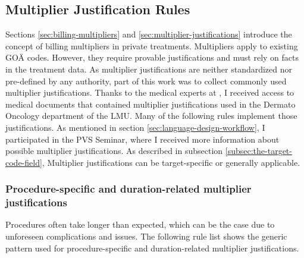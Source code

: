 \subsection{Multiplier Justification Rules}\label{subsec:multiplier-justification-rules}
Sections \ref{sec:billing-multipliers} and \ref{sec:multiplier-justifications} introduce the concept of billing multipliers in private treatments.
Multipliers apply to existing GOÄ codes.
However, they require provable justifications and must rely on facts in the treatment data.
As multiplier justifications are neither standardized nor pre-defined by any authority,
part of this work was to collect commonly used multiplier justifications.
Thanks to the medical experts at \AV, I received access to medical documents that contained multiplier justifications used in the Dermato Oncology department of the LMU.
Many of the following rules implement those justifications.
As mentioned in section \ref{sec:language-design-workflow}, I participated in the PVS Seminar, where I received more information about possible multiplier justifications.
As described in subsection \ref{subsec:the-target-code-field}, Multiplier justifications can be target-specific or generally applicable.







\subsubsection{Procedure-specific and duration-related multiplier justifications}
Procedures often take longer than expected, which can be the case due to unforeseen complications and issues.
The following rule list shows the generic pattern used for procedure-specific and duration-related multiplier justifications.

%

